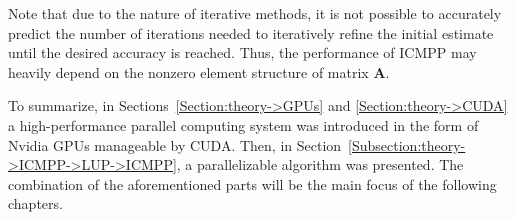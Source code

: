 Note that due to the nature of iterative methods, it is not possible to accurately predict the number of iterations needed to iteratively refine the initial estimate until the desired accuracy is reached.
Thus, the performance of ICMPP may heavily depend on the nonzero element structure of matrix $\mathbf{A}$.

To summarize, in Sections~\ref{Section:theory->GPUs} and \ref{Section:theory->CUDA} a high-performance parallel computing system was introduced in the form of Nvidia GPUs manageable by CUDA.
Then, in Section~\ref{Subsection:theory->ICMPP->LUP->ICMPP}, a parallelizable algorithm was presented.
The combination of the aforementioned parts will be the main focus of the following chapters.